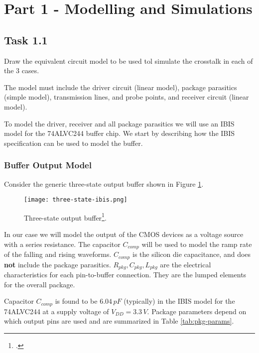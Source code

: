 \documentclass[../main.tex]{subfiles}
\begin{document}
\section{Part 1 - Modelling and Simulations}

\subsection{Task 1.1}

Draw the equivalent circuit model to be used tol simulate the crosstalk in each of the 3 cases.

\vspace{10pt}
The model must include the driver circuit (linear model), package parasitics (simple model), transmission lines, and probe points, and receiver circuit (linear model).

\solution

To model the driver, receiver and all package parasitics we will use an IBIS model for the 74ALVC244 buffer chip. We start by describing how the IBIS specification can be used to model the buffer. 

\subsubsection{Buffer Output Model}

Consider the generic three-state output buffer shown in Figure \ref{fig:ibis-buffer}.

\begin{figure}[h]
    \centering
    \texttt{[image: three-state-ibis.png]}
    \caption{Three-state output buffer\footcite{ibis}.}
    \label{fig:ibis-buffer}
\end{figure}

In our case we will model the output of the CMOS devices as a voltage source with a series resistance. The capacitor $C_{comp}$ will be used to model the ramp rate of the falling and rising waveforms. $C_{comp}$ is the silicon die capacitance, and does \textbf{not} include the package parasitics. $R_{pkg}, C_{pkg}, L_{pkg}$ are the electrical characteristics for each pin-to-buffer connection. They are the lumped elements for the overall package.

\vspace{10pt}
Capacitor $C_{comp}$ is found to be $6.04\,\si{pF}$ (typically) in the IBIS model for the 74ALVC244 at a supply voltage of $V_{DD} = 3.3\,\si{V}$. Package parameters depend on which output pins are used and are summarized in Table \ref{tab:pkg-params}.
\end{document}
